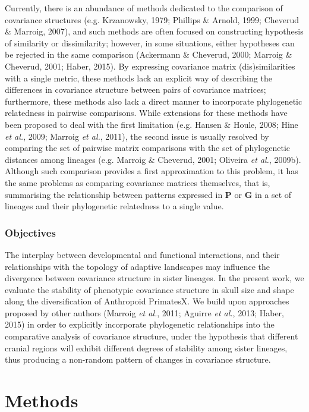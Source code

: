 \documentclass[12pt,twoside]{report}
\begin{document}
Currently, there is an abundance of methods dedicated to the comparison
of covariance structures (e.g. Krzanowsky, 1979; Phillips \& Arnold,
1999; Cheverud \& Marroig, 2007), and such methods are often focused on
constructing hypothesis of similarity or dissimilarity; however, in some
situations, either hypotheses can be rejected in the same comparison
(Ackermann \& Cheverud, 2000; Marroig \& Cheverud, 2001; Haber, 2015).
By expressing covariance matrix (dis)similarities with a single metric,
these methods lack an explicit way of describing the differences in
covariance structure between pairs of covariance matrices; furthermore,
these methods also lack a direct manner to incorporate phylogenetic
relatedness in pairwise comparisons. While extensions for these methods
have been proposed to deal with the first limitation (e.g. Hansen \&
Houle, 2008; Hine \emph{et al.}, 2009; Marroig \emph{et al.}, 2011), the
second issue is usually resolved by comparing the set of pairwise matrix
comparisons with the set of phylogenetic distances among lineages (e.g.
Marroig \& Cheverud, 2001; Oliveira \emph{et al.}, 2009b). Although such
comparison provides a first approximation to this problem, it has the
same problems as comparing covariance matrices themselves, that is,
summarising the relationship between patterns expressed in $\mathbf{P}$
or $\mathbf{G}$ in a set of lineages and their phylogenetic relatedness
to a single value.

\subsubsection{Objectives}\label{objectives-1}

The interplay between developmental and functional interactions, and
their relationships with the topology of adaptive landscapes may
influence the divergence between covariance structure in sister
lineages. In the present work, we evaluate the stability of phenotypic
covariance structure in skull size and shape along the diversification
of Anthropoid PrimatesX. We build upon approaches proposed by other
authors (Marroig \emph{et al.}, 2011; Aguirre \emph{et al.}, 2013;
Haber, 2015) in order to explicitly incorporate phylogenetic
relationships into the comparative analysis of covariance structure,
under the hypothesis that different cranial regions will exhibit
different degrees of stability among sister lineages, thus producing a
non-random pattern of changes in covariance structure.

\section{Methods}\label{methods-2}
\end{document}
